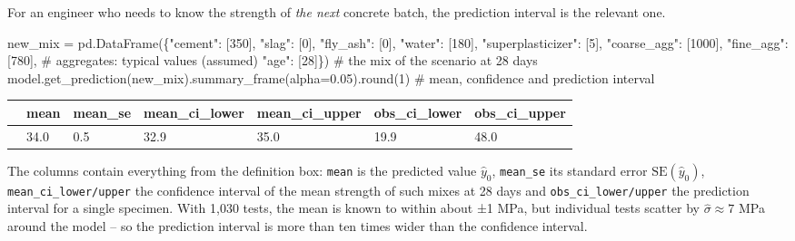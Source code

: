 \documentclass[
  letterpaper,
  DIV=11,
  numbers=noendperiod]{scrreprt}
\newenvironment{Shaded}{\begin{snugshade}}{\end{snugshade}}
\newcommand{\BuiltInTok}[1]{\textcolor[rgb]{0.00,0.23,0.31}{#1}}
\newcommand{\CommentTok}[1]{\textcolor[rgb]{0.37,0.37,0.37}{#1}}
\newcommand{\DecValTok}[1]{\textcolor[rgb]{0.68,0.00,0.00}{#1}}
\newcommand{\FloatTok}[1]{\textcolor[rgb]{0.68,0.00,0.00}{#1}}
\newcommand{\NormalTok}[1]{\textcolor[rgb]{0.00,0.23,0.31}{#1}}
\newcommand{\OperatorTok}[1]{\textcolor[rgb]{0.37,0.37,0.37}{#1}}
\newcommand{\StringTok}[1]{\textcolor[rgb]{0.13,0.47,0.30}{#1}}
\begin{document}
For an engineer who needs to know the strength of \emph{the next}
concrete batch, the prediction interval is the relevant one.

\begin{Shaded}
\begin{Highlighting}[]
\NormalTok{new\_mix }\OperatorTok{=}\NormalTok{ pd.DataFrame(\{}\StringTok{"cement"}\NormalTok{: [}\DecValTok{350}\NormalTok{], }\StringTok{"slag"}\NormalTok{: [}\DecValTok{0}\NormalTok{], }\StringTok{"fly\_ash"}\NormalTok{: [}\DecValTok{0}\NormalTok{], }\StringTok{"water"}\NormalTok{: [}\DecValTok{180}\NormalTok{],}
                        \StringTok{"superplasticizer"}\NormalTok{: [}\DecValTok{5}\NormalTok{],}
                        \StringTok{"coarse\_agg"}\NormalTok{: [}\DecValTok{1000}\NormalTok{], }\StringTok{"fine\_agg"}\NormalTok{: [}\DecValTok{780}\NormalTok{],  }\CommentTok{\# aggregates: typical values (assumed)}
                        \StringTok{"age"}\NormalTok{: [}\DecValTok{28}\NormalTok{]\})                             }\CommentTok{\# the mix of the scenario at 28 days}
\NormalTok{model.get\_prediction(new\_mix).summary\_frame(alpha}\OperatorTok{=}\FloatTok{0.05}\NormalTok{).}\BuiltInTok{round}\NormalTok{(}\DecValTok{1}\NormalTok{)  }\CommentTok{\# mean, confidence and prediction interval}
\end{Highlighting}
\end{Shaded}

\begin{longtable}[]{@{}lllllll@{}}
\toprule\noalign{}
& mean & mean\_se & mean\_ci\_lower & mean\_ci\_upper & obs\_ci\_lower &
obs\_ci\_upper \\
\midrule\noalign{}
\endhead
\bottomrule\noalign{}
\endlastfoot
0 & 34.0 & 0.5 & 32.9 & 35.0 & 19.9 & 48.0 \\
\end{longtable}

The columns contain everything from the definition box: \texttt{mean} is
the predicted value \(\hat y_0\), \texttt{mean\_se} its standard error
\(\text{SE}(\hat y_0)\), \texttt{mean\_ci\_lower/upper} the confidence
interval of the mean strength of such mixes at 28 days and
\texttt{obs\_ci\_lower/upper} the prediction interval for a single
specimen. With 1,030 tests, the mean is known to within about ±1 MPa,
but individual tests scatter by \(\hat\sigma \approx 7\) MPa around the
model -- so the prediction interval is more than ten times wider than
the confidence interval.
\end{document}
